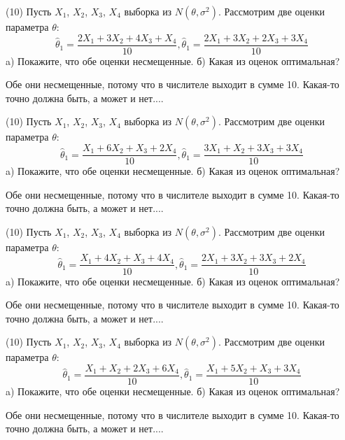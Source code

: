 \begin{problem}
(10) Пусть $X _{1}$, $X _{2}$, $X _{3}$, $X _{4}$ выборка из $N(\theta, \sigma ^{2})$. Рассмотрим две оценки параметра $\theta$:
\[\hat \theta _{1} = \frac{2X _{1} + 3X _{2} + 4X _{3} + X _{4}}{10}, \hat \theta _{1} = \frac{2X _{1} + 3X _{2} + 2X _{3} + 3X _{4}}{10}\]
a) Покажите, что обе оценки несмещенные.
б) Какая из оценок оптимальная?
\end{problem}
\begin{solution}
Обе они несмещенные, потому что в числителе выходит в сумме 10.
Какая-то точно должна быть, а может и нет....
\end{solution}
\begin{problem}
(10) Пусть $X _{1}$, $X _{2}$, $X _{3}$, $X _{4}$ выборка из $N(\theta, \sigma ^{2})$. Рассмотрим две оценки параметра $\theta$:
\[\hat \theta _{1} = \frac{X _{1} + 6X _{2} + X _{3} + 2X _{4}}{10}, \hat \theta _{1} = \frac{3X _{1} + X _{2} + 3X _{3} + 3X _{4}}{10}\]
a) Покажите, что обе оценки несмещенные.
б) Какая из оценок оптимальная?
\end{problem}
\begin{solution}
Обе они несмещенные, потому что в числителе выходит в сумме 10.
Какая-то точно должна быть, а может и нет....
\end{solution}
\begin{problem}
(10) Пусть $X _{1}$, $X _{2}$, $X _{3}$, $X _{4}$ выборка из $N(\theta, \sigma ^{2})$. Рассмотрим две оценки параметра $\theta$:
\[\hat \theta _{1} = \frac{X _{1} + 4X _{2} + X _{3} + 4X _{4}}{10}, \hat \theta _{1} = \frac{2X _{1} + 3X _{2} + 3X _{3} + 2X _{4}}{10}\]
a) Покажите, что обе оценки несмещенные.
б) Какая из оценок оптимальная?
\end{problem}
\begin{solution}
Обе они несмещенные, потому что в числителе выходит в сумме 10.
Какая-то точно должна быть, а может и нет....
\end{solution}
\begin{problem}
(10) Пусть $X _{1}$, $X _{2}$, $X _{3}$, $X _{4}$ выборка из $N(\theta, \sigma ^{2})$. Рассмотрим две оценки параметра $\theta$:
\[\hat \theta _{1} = \frac{X _{1} + X _{2} + 2X _{3} + 6X _{4}}{10}, \hat \theta _{1} = \frac{X _{1} + 5X _{2} + X _{3} + 3X _{4}}{10}\]
a) Покажите, что обе оценки несмещенные.
б) Какая из оценок оптимальная?
\end{problem}
\begin{solution}
Обе они несмещенные, потому что в числителе выходит в сумме 10.
Какая-то точно должна быть, а может и нет....
\end{solution}
